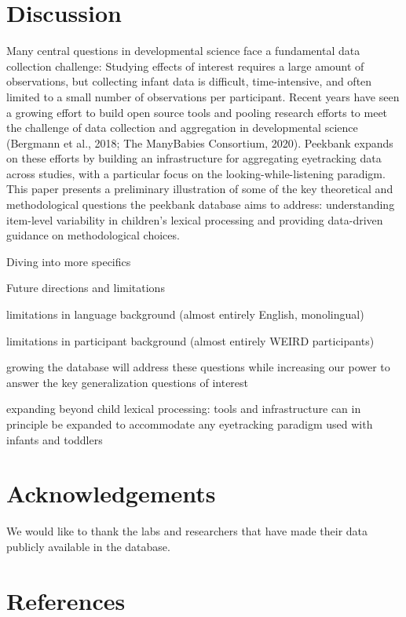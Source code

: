 \documentclass[10pt, letterpaper]{article}
\begin{document}
\hypertarget{discussion}{%
\section{Discussion}\label{discussion}}

Many central questions in developmental science face a fundamental data
collection challenge: Studying effects of interest requires a large
amount of observations, but collecting infant data is difficult,
time-intensive, and often limited to a small number of observations per
participant. Recent years have seen a growing effort to build open
source tools and pooling research efforts to meet the challenge of data
collection and aggregation in developmental science (Bergmann et al.,
2018; The ManyBabies Consortium, 2020). Peekbank expands on these
efforts by building an infrastructure for aggregating eyetracking data
across studies, with a particular focus on the looking-while-listening
paradigm. This paper presents a preliminary illustration of some of the
key theoretical and methodological questions the peekbank database aims
to address: understanding item-level variability in children's lexical
processing and providing data-driven guidance on methodological choices.

Diving into more specifics

Future directions and limitations

limitations in language background (almost entirely English,
monolingual)

limitations in participant background (almost entirely WEIRD
participants)

growing the database will address these questions while increasing our
power to answer the key generalization questions of interest

expanding beyond child lexical processing: tools and infrastructure can
in principle be expanded to accommodate any eyetracking paradigm used
with infants and toddlers

\hypertarget{acknowledgements}{%
\section{Acknowledgements}\label{acknowledgements}}

We would like to thank the labs and researchers that have made their
data publicly available in the database.

\hypertarget{references}{%
\section{References}\label{references}}
\end{document}
